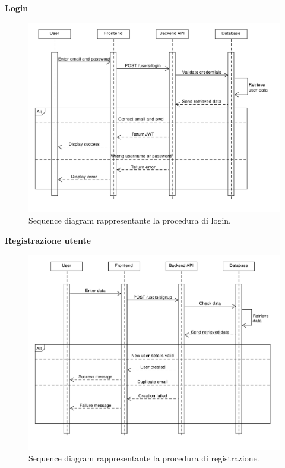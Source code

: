\documentclass[9pt]{extarticle}
\begin{document}
\textbf{Login}
\begin{figure}[!htb]
	\centering
	\includegraphics[width=\linewidth]{./images/SequenceDiagramLogin.pdf}
	\caption{Sequence diagram rappresentante la procedura di login.}
	\label{fig:SeqDiagLogin}
\end{figure}

\newpage
\textbf{Registrazione utente}
\begin{figure}[!htb]
	\centering
	\includegraphics[width=\linewidth]{./images/SequenceDiagramRegistration.pdf}
	\caption{Sequence diagram rappresentante la procedura di registrazione.}
	\label{fig:SeqDiagReg}
\end{figure}
\end{document}
